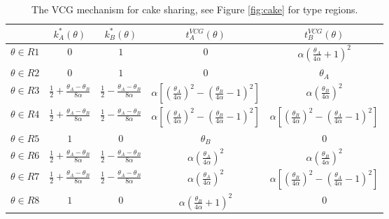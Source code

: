 \documentclass[a4paper]{article}
\begin{document}
\begin{enumerate}
	\begin{table}[h]
		\begin{center}
			\renewcommand{\arraystretch}{1.3}
		\begin{tabular}[center]{|| c | c c c c ||}
			\hline
			& $k^*_A(\theta)$ & $k^*_B(\theta)$ & $t^{VCG}_A(\theta)$ & $t^{VCG}_B(\theta)$
			\\
			\hline\hline 
			$\theta \in R1$ & $0$ & $1$ & $0$ & $\alpha \left(\frac{\theta_A}{4\alpha}+1\right)^2$
			\\
			\hline
			$\theta \in R2$ & $0$ & $1$ & $0$ & $\theta_A$
			\\
			\hline
			$\theta \in R3$ & $\frac{1}{2}+\frac{\theta_A-\theta_B}{8\alpha}$ & $\frac{1}{2}-\frac{\theta_A-\theta_B}{8\alpha}$ & $\alpha \left[ \left(\frac{\theta_A}{4\alpha}\right)^2 - \left(\frac{\theta_B}{4\alpha}-1\right)^2 \right]$ & $\alpha \left(\frac{\theta_B}{4\alpha}\right)^2$
			\\
			\hline
			$\theta \in R4$ & $\frac{1}{2}+\frac{\theta_A-\theta_B}{8\alpha}$ & $\frac{1}{2}-\frac{\theta_A-\theta_B}{8\alpha}$ & $\alpha \left[ \left(\frac{\theta_A}{4\alpha}\right)^2 - \left(\frac{\theta_B}{4\alpha}-1\right)^2 \right]$ & $\alpha \left[ \left(\frac{\theta_B}{4\alpha}\right)^2 - \left(\frac{\theta_A}{4\alpha}-1\right)^2 \right]$
			\\
			\hline
			$\theta \in R5$ & $1$ & $0$ & $\theta_B$ & $0$
			\\
			\hline
			$\theta \in R6$ & $\frac{1}{2}+\frac{\theta_A-\theta_B}{8\alpha}$ & $\frac{1}{2}-\frac{\theta_A-\theta_B}{8\alpha}$ & $\alpha \left(\frac{\theta_A}{4\alpha}\right)^2$ & $\alpha \left(\frac{\theta_B}{4\alpha}\right)^2$
			\\
			\hline
			$\theta \in R7$ & $\frac{1}{2}+\frac{\theta_A-\theta_B}{8\alpha}$ & $\frac{1}{2}-\frac{\theta_A-\theta_B}{8\alpha}$ & $\alpha \left(\frac{\theta_A}{4\alpha}\right)^2$ & $\alpha \left[ \left(\frac{\theta_B}{4\alpha}\right)^2 - \left(\frac{\theta_A}{4\alpha}-1\right)^2 \right]$
			\\
			\hline
			$\theta \in R8$ & $1$ & $0$ & $\alpha \left(\frac{\theta_B}{4\alpha}+1\right)^2$ & $0$
			\\
			\hline
		\end{tabular}
		\caption{The VCG mechanism for cake sharing, see Figure \ref{fig:cake} for type regions.}
		\label{table:cake}
		\end{center}
	\end{table}
	\begin{figure}[h]
		\begin{center} 

\end{center}
\end{figure}
\end{enumerate}
\end{document}
